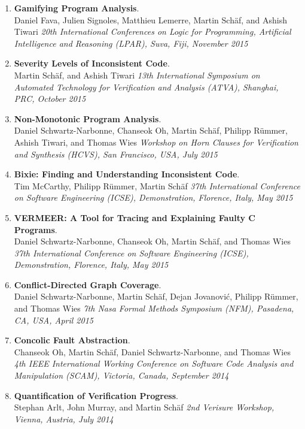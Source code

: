 \begin{enumerate}
  \item \textbf{Gamifying Program Analysis}.
  \\  Daniel Fava, Julien Signoles, Matthieu Lemerre, Martin Schäf, and Ashish Tiwari
  \emph{20th International Conferences on Logic for Programming, Artificial Intelligence and Reasoning (LPAR), Suva, Fiji, November 2015}

  \item \textbf{Severity Levels of Inconsistent Code}.
  \\  Martin Schäf, and Ashish Tiwari
  \emph{13th International Symposium on Automated Technology for Verification and Analysis (ATVA), Shanghai, PRC, October 2015}

  \item \textbf{Non-Monotonic Program Analysis}.
  \\  Daniel Schwartz-Narbonne, Chanseok Oh, Martin Schäf, Philipp Rümmer, Ashish Tiwari, and Thomas Wies
  \emph{Workshop on Horn Clauses for Verification and Synthesis (HCVS), San Francisco, USA, July 2015}

  \item \textbf{Bixie: Finding and Understanding Inconsistent Code}.
  \\  Tim McCarthy, Philipp Rümmer, Martin Schäf
  \emph{37th International Conference on Software Engineering (ICSE), Demonstration, Florence, Italy, May 2015}

  \item \textbf{VERMEER: A Tool for Tracing and Explaining Faulty C Programs}.
  \\  Daniel Schwartz-Narbonne, Chanseok Oh, Martin Schäf, and Thomas Wies
  \emph{37th International Conference on Software Engineering (ICSE), Demonstration, Florence, Italy, May 2015}

  \item \textbf{Conflict-Directed Graph Coverage}.
  \\  Daniel Schwartz-Narbonne, Martin Schäf, Dejan Jovanović, Philipp Rümmer, and Thomas Wies
  \emph{7th Nasa Formal Methods Symposium (NFM), Pasadena, CA, USA, April 2015}

  \item \textbf{Concolic Fault Abstraction}.
  \\  Chanseok Oh, Martin Schäf, Daniel Schwartz-Narbonne, and Thomas Wies
  \emph{4th IEEE International Working Conference on Software Code Analysis and Manipulation (SCAM), Victoria, Canada, September 2014}

  \item \textbf{Quantification of Verification Progress}.
  \\  Stephan Arlt, John Murray, and Martin Schäf
  \emph{2nd Verisure Workshop, Vienna, Austria, July 2014}


\end{enumerate}

